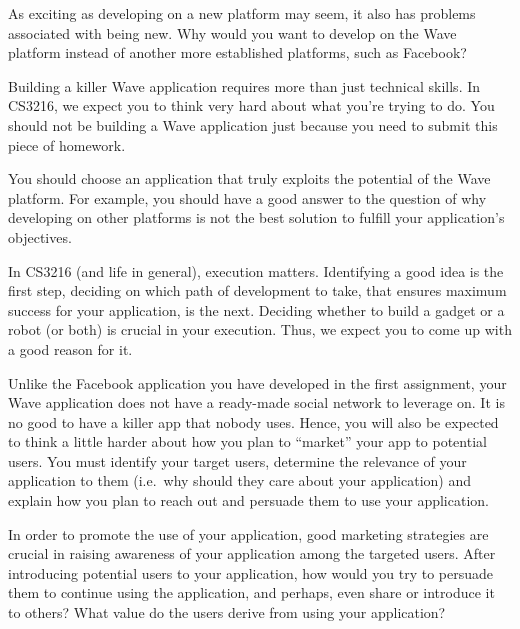 As exciting as developing on a new platform may seem, it also
has problems associated with being new. Why would you want to develop
on the Wave platform instead of another more established platforms,
such as Facebook?

Building a killer Wave application requires more than just technical
skills. In CS3216, we expect you to think very hard about what you're
trying to do. You should not be building a Wave application just
because you need to submit this piece of homework.

You should choose an application that truly exploits the potential of
the Wave platform. For example, you should have a good answer to the
question of why developing on other platforms is not the best solution
to fulfill your application's objectives.

In CS3216 (and life in general), execution matters. Identifying a good
idea is the first step, deciding on which path of development to take,
that ensures maximum success for your application, is the
next. Deciding whether to build a gadget or a robot (or both) is
crucial in your execution. Thus, we expect you to come up with a good
reason for it.


Unlike the Facebook application you have developed in the first assignment,
your Wave application does not have a ready-made social network to
leverage on. It is no good to have a killer app that nobody
uses. Hence, you will also be expected to think a little harder about
how you plan to ``market'' your app to potential users. You must
identify your target users, determine the relevance of your
application to them (i.e.\ why should they care about your
application) and explain how you plan to reach out and persuade them
to use your application.

In order to promote the use of your application, good marketing
strategies are crucial in raising awareness of your application among
the targeted users. After introducing potential users to your
application, how would you try to persuade them to continue using the
application, and perhaps, even share or introduce it to others?  What
value do the users derive from using your application?

